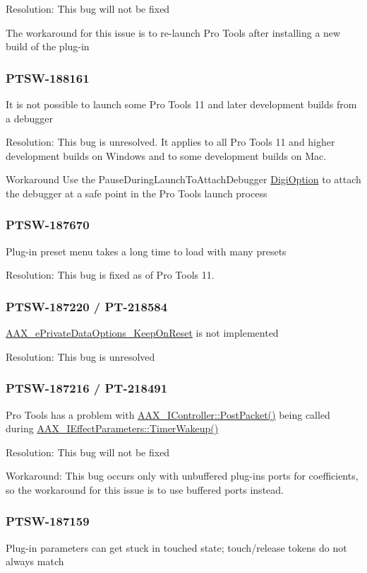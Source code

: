 Resolution\+: This bug will not be fixed

The workaround for this issue is to re-\/launch Pro Tools after installing a new build of the plug-\/in\hypertarget{a00846_PTSW-188161}{}\subsubsection{P\+T\+S\+W-\/188161}\label{a00846_PTSW-188161}
It is not possible to launch some Pro Tools 11 and later development builds from a debugger

Resolution\+: This bug is unresolved. It applies to all Pro Tools 11 and higher development builds on Windows and to some development builds on Mac.

Workaround Use the Pause\+During\+Launch\+To\+Attach\+Debugger \mbox{\hyperlink{a00830_aax_pro_tools_guide_06c_digioptions}{Digi\+Option}} to attach the debugger at a safe point in the Pro Tools launch process\hypertarget{a00846_PTSW-187670}{}\subsubsection{P\+T\+S\+W-\/187670}\label{a00846_PTSW-187670}
Plug-\/in preset menu takes a long time to load with many presets

Resolution\+: This bug is fixed as of Pro Tools 11.\hypertarget{a00846_PTSW-187220}{}\subsubsection{P\+T\+S\+W-\/187220 / P\+T-\/218584}\label{a00846_PTSW-187220}
\mbox{\hyperlink{a00491_a9f1ef2cb64daf30eaf145dfbb8cd0d00a393309ed2a9c5d784e837705a58854ab}{A\+A\+X\+\_\+e\+Private\+Data\+Options\+\_\+\+Keep\+On\+Reset}} is not implemented

Resolution\+: This bug is unresolved\hypertarget{a00846_PTSW-187216}{}\subsubsection{P\+T\+S\+W-\/187216 / P\+T-\/218491}\label{a00846_PTSW-187216}
Pro Tools has a problem with \mbox{\hyperlink{a01789_ae5dd2b5925dbc181513bca1c4ac5e716}{A\+A\+X\+\_\+\+I\+Controller\+::\+Post\+Packet()}} being called during \mbox{\hyperlink{a01669_ab5b8da9e1a9d778d327ac04f4ab8d139}{A\+A\+X\+\_\+\+I\+Effect\+Parameters\+::\+Timer\+Wakeup()}}

Resolution\+: This bug will not be fixed

Workaround\+: This bug occurs only with unbuffered plug-\/ins\textquotesingle{} ports for coefficients, so the workaround for this issue is to use buffered ports instead.\hypertarget{a00846_PTSW-187159}{}\subsubsection{P\+T\+S\+W-\/187159}\label{a00846_PTSW-187159}
Plug-\/in parameters can get stuck in touched state; touch/release tokens do not always match

